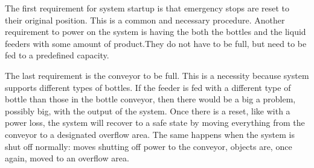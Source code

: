 The first requirement for system startup is that emergency stops are reset to their original position. This is a common and necessary procedure. Another requirement to power on the system is having the both the bottles and the liquid feeders with some amount of product.They do not have to be full, but need to be fed to a predefined capacity.

The last requirement is the conveyor to be full. This is a necessity because system supports different types of bottles. If the feeder is fed with a different type of bottle than those in the bottle conveyor, then there would be a big a problem, possibly big, with the output of the system. Once there is a reset, like with a power loss, the system will recover to a safe state by moving everything from the conveyor to a designated overflow area. The same happens when the system is shut off normally: moves shutting off power to the conveyor, objects are, once again, moved to an overflow area.